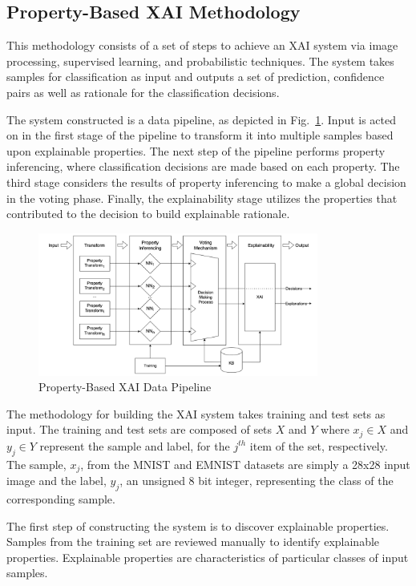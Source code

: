\documentclass[conference]{IEEEtran}
\begin{document}
\subsection{Property-Based XAI Methodology}

This methodology consists of a set of steps to achieve an XAI system via image
processing, supervised learning, and probabilistic techniques. The system takes
samples for classification as input and outputs a set of prediction, confidence
pairs as well as rationale for the classification decisions.

The system constructed is a data pipeline, as depicted in
Fig.~\ref{fig:xai_data_pipeline}.  Input is acted on in the first stage of the
pipeline to transform it into multiple samples based upon explainable
properties.  The next step of the pipeline performs property inferencing, where
classification decisions are made based on each property. The third stage
considers the results of property inferencing to make a global decision in the
voting phase. Finally, the explainability stage utilizes the properties that
contributed to the decision to build explainable rationale.

\begin{figure}
    \includegraphics[width=9.2cm]{./images/xai-pipeline.png}
    \caption{Property-Based XAI Data Pipeline}
    \label{fig:xai_data_pipeline}
\end{figure}

The methodology for building the XAI system takes training and test sets as
input. The training and test sets are composed of sets $X$ and $Y$ where $x_j
\in X$ and $y_j \in Y$ represent the sample and label, for the $j^{th}$ item of
the set, respectively.  The sample, $x_j$, from the MNIST and EMNIST datasets
are simply a 28x28 input image and the label, $y_j$, an unsigned 8 bit integer,
representing the class of the corresponding sample. 

The first step of constructing the system is to discover explainable properties.
Samples from the training set are reviewed manually to identify explainable
properties. Explainable properties are characteristics of particular classes of
input samples.
\end{document}
